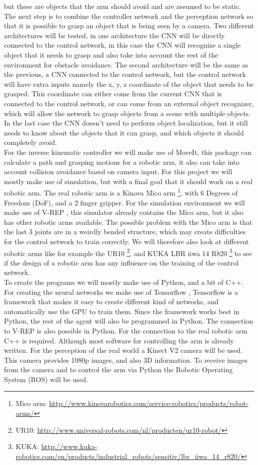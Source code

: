 but these are objects that the arm should avoid and are assumed to be static. \\
The next step is to combine the controller network and the perception network so that it is possible to grasp an object that is being seen by a camera. Two different architectures will be tested, in one architecture the CNN will
be directly connected to the control network, in this case the CNN will recognize a single object that it needs to grasp and also take into account the rest of the environment for obstacle avoidance. The second architecture will be
the same as the previous, a CNN connected to the control network, but the control network will have extra inputs namely the x, y, z coordinate of the object that needs to be grasped. This coordinate can either come from the current
CNN that is connected to the control network, or can come from an external object recognizer, which will allow the network to grasp objects from a scene with multiple objects. In the last case the CNN doesn't need to perform 
object localization, but it still needs to know about the objects that it can grasp, and which objects it should completely avoid. \\
For the inverse kinematic controller we will make use of MoveIt, this package can calculate a path and grasping motions for a robotic arm, it also can take into account collision avoidance based on camera input.
For this project we will mostly make use of simulation, but with a final goal that it should work on a real robotic arm. The real robotic arm is a Kinova Mico arm \footnote{Mico arm: \url{http://www.kinovarobotics.com/service-robotics/products/robot-arms/}}, with 6 Degrees of Freedom (DoF), and a 2 finger gripper. 
For the simulation environment we will make use of V-REP \cite{vrep}, this simulator already contains the Mico arm, but it also has other robotic arms available. The possible problem with the Mico arm is that the last 3 joints
are in a weirdly bended structure, which may create difficulties for the control network to train correctly. We will therefore also look at different robotic arms like for example the UR10 \footnote{UR10: \url{http://www.universal-robots.com/nl/producten/ur10-robot/}}, and 
KUKA LBR iiwa 14 R820 \footnote{KUKA: \url{http://www.kuka-robotics.com/en/products/industrial_robots/sensitiv/lbr_iiwa_14_r820/} } to see if the design of a robotic arm has any influence on the training of the control network. \\
To create the programs we will mostly make use of Python, and a bit of C++. For creating the neural networks we make use of Tensorflow \cite{tensorflow2015-whitepaper}, Tensorflow is a framework that makes it easy to create different kind of 
networks, and automatically use the GPU to train them. Since the framework works best in Python, the rest of the agent will also be programmed in Python. The connection to V-REP is also possible 
in Python. For the connection to the real robotic arm C++ is required. Although most software for controlling the arm is already written. For the perception of the real world a Kinect V2 camera will be used. This camera
provides 1080p images, and also 3D information. To receive images from the camera and to control the arm via Python the Robotic Operating System (ROS) \cite{ros} will be used. 


